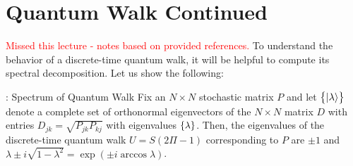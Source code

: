 \section{Quantum Walk Continued}
\textcolor{red}{Missed this lecture - notes based on provided references.}
To understand the behavior of a discrete-time quantum walk, it will be helpful to compute its spectral decomposition. Let us show the following:

\begin{thmbox}{: Spectrum of Quantum Walk}
    Fix an $N \times N$ stochastic matrix $P$ and let $\set{\lvert \lambda \rangle}$ denote a complete set of orthonormal eigenvectors of the $N \times N$ matrix $D$ with entries $D_{jk} = \sqrt{P_{jk}P_{kj}}$ with eigenvalues $\set{\lambda}$. Then, the eigenvalues of the discrete-time quantum walk $U = S(2\Pi - 1)$ corresponding to $P$ are $\pm 1$ and $\lambda \pm i\sqrt{1-\lambda^2} = \exp(\pm i \arccos \lambda)$.
\end{thmbox}
